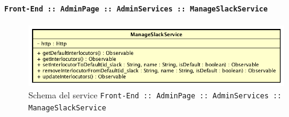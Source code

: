 \documentclass[../DefinizioneDiProdotto_v3.0.0.tex]{subfiles}
\begin{document}
     	 		\paragraph{\texttt{Front-End :: AdminPage :: AdminServices :: ManageSlackService}}
     	 		\acapo
				\begin{figure}[!h]
					\centering
					\includegraphics[scale=0.7]{Architettura/Front-End/AdminPage/AdminServices/ManageSlackService.png}
					\caption{Schema del service \texttt{Front-End :: AdminPage :: AdminServices :: ManageSlackService}}
				\end{figure}
\end{document}

